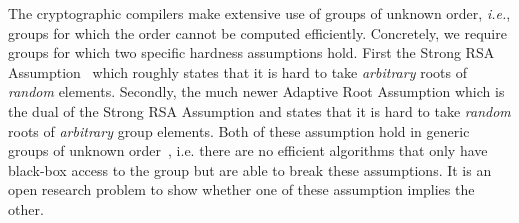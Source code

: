 \documentclass{article}
\theoremstyle{definition}
\begin{document}
The cryptographic compilers make extensive use of groups of unknown order, \emph{i.e.}, groups for which the order cannot be computed efficiently.
Concretely, we require groups for which two specific hardness assumptions hold.
First the Strong RSA Assumption~\cite{CCS:CraSho99} which roughly states that it is hard to take \emph{arbitrary} roots of \emph{random} elements. Secondly, the much newer Adaptive Root Assumption\cite{EC:Wesolowski19} which is the dual of the Strong RSA Assumption and states that it is hard to take \emph{random} roots of \emph{arbitrary} group elements. 
Both of these assumption hold in generic groups of unknown order~\cite{genericunknown,C:BonBunFis19}, i.e. there are no efficient algorithms that only have black-box access to the group but are able to break these assumptions. 
It is an open research problem to show whether one of these assumption implies the other.
\end{document}
